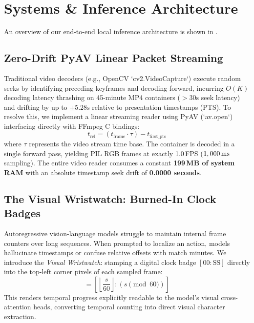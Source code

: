 \documentclass[10pt,twocolumn,letterpaper]{article}
\begin{document}
\section{Systems \& Inference Architecture}
\label{sec:architecture}

An overview of our end-to-end local inference architecture is shown in .

\subsection{Zero-Drift PyAV Linear Packet Streaming}
Traditional video decoders (e.g., OpenCV `cv2.VideoCapture`) execute random seeks by identifying preceding keyframes and decoding forward, incurring $O(K)$ decoding latency thrashing on 45-minute MP4 containers ($>30\text{s}$ seek latency) and drifting by up to $\pm 5.28\text{s}$ relative to presentation timestamps (PTS).
To resolve this, we implement a linear streaming reader using PyAV (`av.open`) interfacing directly with FFmpeg C bindings:
\begin{equation}
    t_{\text{rel}} = (t_{\text{frame}} \cdot \tau) - t_{\text{first\_pts}}
\end{equation}
where $\tau$ represents the video stream time base. The container is decoded in a single forward pass, yielding PIL RGB frames at exactly 1.0\,FPS ($1,000\text{\,ms}$ sampling). The entire video reader consumes a constant \textbf{199\,MB of system RAM} with an absolute timestamp seek drift of \textbf{0.0000 seconds}.

\subsection{The Visual Wristwatch: Burned-In Clock Badges}
Autoregressive vision-language models struggle to maintain internal frame counters over long sequences. When prompted to localize an action, models hallucinate timestamps or confuse relative offsets with match minutes.
We introduce the \textit{Visual Wristwatch}: stamping a digital clock badge $[00:\text{SS}]$ directly into the top-left corner pixels of each sampled frame:
\begin{equation}
    [00:\text{SS}] = \left[ \left\lfloor \frac{s}{60} \right\rfloor : (s \pmod{60}) \right]
\end{equation}
This renders temporal progress explicitly readable to the model's visual cross-attention heads, converting temporal counting into direct visual character extraction.
\end{document}
